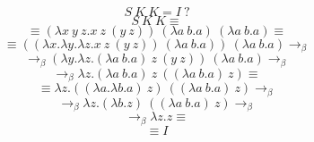 \documentclass[12pt]{article}
\begin{document}
\[ S \ K \ K = I \ \text{?} \]
\[ S \ K \ K \equiv \]
\[ \equiv (\lambda x \ y \ z.x \ z \ (y \ z)) \ (\lambda a \ b.a) \ (\lambda a \ b.a) \equiv \]
\[ \equiv ((\lambda x.\lambda y.\lambda z.x \ z \ (y \ z)) \ (\lambda a \ b.a)) \ (\lambda a \ b.a) \rightarrow_\beta \]
\[ \rightarrow_\beta (\lambda y.\lambda z.(\lambda a \ b.a) \ z \ (y \ z)) \ (\lambda a \ b.a) \rightarrow_\beta \]
\[ \rightarrow_\beta \lambda z.(\lambda a \ b.a) \ z \ ((\lambda a \ b.a) \ z) \equiv \]
\[ \equiv \lambda z.((\lambda a.\lambda b.a) \ z) \ ((\lambda a \ b.a) \ z) \rightarrow_\beta \]
\[ \rightarrow_\beta \lambda z.(\lambda b.z) \ ((\lambda a \ b.a) \ z) \rightarrow_\beta \]
\[ \rightarrow_\beta \lambda z.z \equiv \]
\[ \equiv I \]
\end{document}
